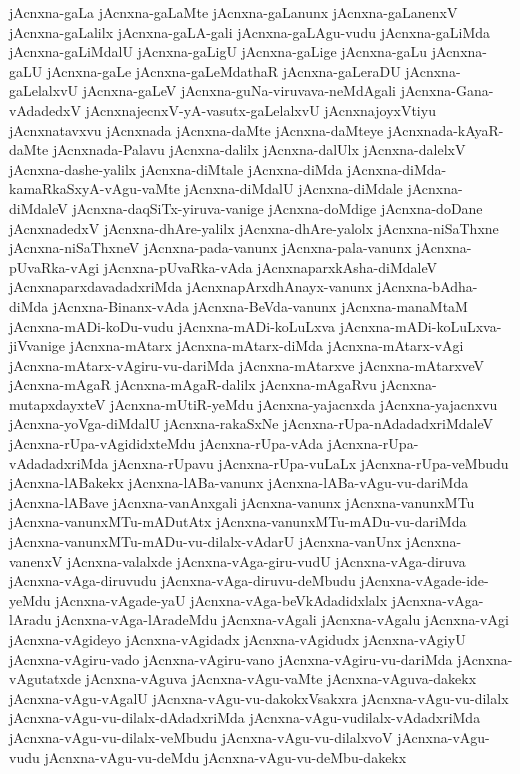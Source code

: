 {jAcnxna-gaLa
jAcnxna-gaLaMte
jAcnxna-gaLanunx
jAcnxna-gaLanenxV
jAcnxna-gaLalilx
jAcnxna-gaLA-gali
jAcnxna-gaLAgu-vudu
jAcnxna-gaLiMda
jAcnxna-gaLiMdalU
jAcnxna-gaLigU
jAcnxna-gaLige
jAcnxna-gaLu
jAcnxna-gaLU
jAcnxna-gaLe
jAcnxna-gaLeMdathaR
jAcnxna-gaLeraDU
jAcnxna-gaLelalxvU
jAcnxna-gaLeV
jAcnxna-guNa-viruvava-neMdAgali
jAcnxna-Gana-vAdadedxV
jAcnxnajecnxV-yA-vasutx-gaLelalxvU
jAcnxnajoyxVtiyu
jAcnxnatavxvu
jAcnxnada
jAcnxna-daMte
jAcnxna-daMteye
jAcnxnada-kAyaR-daMte
jAcnxnada-Palavu
jAcnxna-dalilx
jAcnxna-dalUlx
jAcnxna-dalelxV
jAcnxna-dashe-yalilx
jAcnxna-diMtale
jAcnxna-diMda
jAcnxna-diMda-kamaRkaSxyA-vAgu-vaMte
jAcnxna-diMdalU
jAcnxna-diMdale
jAcnxna-diMdaleV
jAcnxna-daqSiTx-yiruva-vanige
jAcnxna-doMdige
jAcnxna-doDane
jAcnxnadedxV
jAcnxna-dhAre-yalilx
jAcnxna-dhAre-yalolx
jAcnxna-niSaThxne
jAcnxna-niSaThxneV
jAcnxna-pada-vanunx
jAcnxna-pala-vanunx
jAcnxna-pUvaRka-vAgi
jAcnxna-pUvaRka-vAda
jAcnxnaparxkAsha-diMdaleV
jAcnxnaparxdavadadxriMda
jAcnxnapArxdhAnayx-vanunx
jAcnxna-bAdha-diMda
jAcnxna-Binanx-vAda
jAcnxna-BeVda-vanunx
jAcnxna-manaMtaM
jAcnxna-mADi-koDu-vudu
jAcnxna-mADi-koLuLxva
jAcnxna-mADi-koLuLxva-jiVvanige
jAcnxna-mAtarx
jAcnxna-mAtarx-diMda
jAcnxna-mAtarx-vAgi
jAcnxna-mAtarx-vAgiru-vu-dariMda
jAcnxna-mAtarxve
jAcnxna-mAtarxveV
jAcnxna-mAgaR
jAcnxna-mAgaR-dalilx
jAcnxna-mAgaRvu
jAcnxna-mutapxdayxteV
jAcnxna-mUtiR-yeMdu
jAcnxna-yajacnxda
jAcnxna-yajacnxvu
jAcnxna-yoVga-diMdalU
jAcnxna-rakaSxNe
jAcnxna-rUpa-nAdadadxriMdaleV
jAcnxna-rUpa-vAgididxteMdu
jAcnxna-rUpa-vAda
jAcnxna-rUpa-vAdadadxriMda
jAcnxna-rUpavu
jAcnxna-rUpa-vuLaLx
jAcnxna-rUpa-veMbudu
jAcnxna-lABakekx
jAcnxna-lABa-vanunx
jAcnxna-lABa-vAgu-vu-dariMda
jAcnxna-lABave
jAcnxna-vanAnxgali
jAcnxna-vanunx
jAcnxna-vanunxMTu
jAcnxna-vanunxMTu-mADutAtx
jAcnxna-vanunxMTu-mADu-vu-dariMda
jAcnxna-vanunxMTu-mADu-vu-dilalx-vAdarU
jAcnxna-vanUnx
jAcnxna-vanenxV
jAcnxna-valalxde
jAcnxna-vAga-giru-vudU
jAcnxna-vAga-diruva
jAcnxna-vAga-diruvudu
jAcnxna-vAga-diruvu-deMbudu
jAcnxna-vAgade-ide-yeMdu
jAcnxna-vAgade-yaU
jAcnxna-vAga-beVkAdadidxlalx
jAcnxna-vAga-lAradu
jAcnxna-vAga-lAradeMdu
jAcnxna-vAgali
jAcnxna-vAgalu
jAcnxna-vAgi
jAcnxna-vAgideyo
jAcnxna-vAgidadx
jAcnxna-vAgidudx
jAcnxna-vAgiyU
jAcnxna-vAgiru-vado
jAcnxna-vAgiru-vano
jAcnxna-vAgiru-vu-dariMda
jAcnxna-vAgutatxde
jAcnxna-vAguva
jAcnxna-vAgu-vaMte
jAcnxna-vAguva-dakekx
jAcnxna-vAgu-vAgalU
jAcnxna-vAgu-vu-dakokxVsakxra
jAcnxna-vAgu-vu-dilalx
jAcnxna-vAgu-vu-dilalx-dAdadxriMda
jAcnxna-vAgu-vudilalx-vAdadxriMda
jAcnxna-vAgu-vu-dilalx-veMbudu
jAcnxna-vAgu-vu-dilalxvoV
jAcnxna-vAgu-vudu
jAcnxna-vAgu-vu-deMdu
jAcnxna-vAgu-vu-deMbu-dakekx
}
